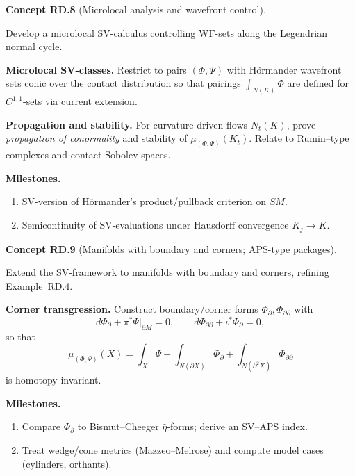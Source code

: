 \documentclass[10pt, letterpaper]{article}
\newcommand{\CustomHeading}[3]{%
  \par\medskip\noindent%
  \textbf{#1 #2} \textnormal{(#3)}.\enskip%
}
\newenvironment{CONC}[2]{\begin{unitbox}\CustomHeading{Concept}{#1}{#2}}{\end{unitbox}}
\begin{document}
\begin{CONC}{RD.8}{Microlocal analysis and wavefront control}
Develop a microlocal SV-calculus controlling $\mathrm{WF}$-sets along the Legendrian normal cycle.

\medskip\noindent\textbf{Microlocal SV-classes.}
Restrict to pairs $(\Phi,\Psi)$ with Hörmander wavefront sets conic over the contact distribution so that
pairings $\int_{N(K)}\Phi$ are defined for $C^{1,1}$-sets via current extension.

\medskip\noindent\textbf{Propagation and stability.}
For curvature-driven flows $N_t(K)$, prove \emph{propagation of conormality} and stability of $\mu_{(\Phi,\Psi)}(K_t)$.
Relate to Rumin–type complexes and contact Sobolev spaces.

\medskip\noindent\textbf{Milestones.}
\begin{enumerate}[label=(\roman*)]
\item SV-version of Hörmander’s product/pullback criterion on $SM$.
\item Semicontinuity of SV-evaluations under Hausdorff convergence $K_j\to K$.
\end{enumerate}
\end{CONC}

\begin{CONC}{RD.9}{Manifolds with boundary and corners; APS-type packages}
Extend the SV-framework to manifolds with boundary and corners, refining Example~RD.4.

\medskip\noindent\textbf{Corner transgression.}
Construct boundary/corner forms $\Phi_{\partial},\Phi_{\partial\partial}$ with
\[
d\Phi_{\partial}+\pi^*\Psi|_{\partial M}=0,\qquad
d\Phi_{\partial\partial}+\iota^*\Phi_{\partial}=0,
\]
so that
\[
\mu_{(\Phi,\Psi)}(X)=\int_X\Psi+\int_{N(\partial X)}\Phi_{\partial}+\int_{N(\partial^2 X)}\Phi_{\partial\partial}
\]
is homotopy invariant.

\medskip\noindent\textbf{Milestones.}
\begin{enumerate}[label=(\roman*)]
\item Compare $\Phi_{\partial}$ to Bismut–Cheeger $\hat\eta$-forms; derive an SV–APS index.
\item Treat wedge/cone metrics (Mazzeo–Melrose) and compute model cases (cylinders, orthants).
\end{enumerate}
\end{CONC}
\end{document}
